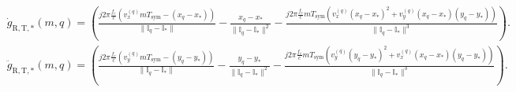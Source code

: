 \documentclass[9pt,final,journal,twocolumn]{IEEEtran}
\begin{document}
\begin{figure}[!t]
\begin{small}
\begin{subequations} \label{derivation_x}
\begin{align} 
  &\dot{g}_{\mathrm{R},\mathrm{T},\ast}(m,q) \!=\!\left(\frac{j2\pi\frac{f_c}{c}(v_{x}^{(q)}mT_{\mathrm{sym}}\!-\!(x_q\!-\!{x}_{\ast}))}{\|{\mathbb I}_{q}-{\mathbb I}_{\ast}\|}-\frac{{x}_q-{x}_{\ast}}{{\|{\mathbb I}_{q}-{\mathbb I}_{\ast}\|^2}} -\frac{j2\pi\frac{f_c}{c}mT_{\mathrm{sym}}(v_{x}^{(q)}({x}_q-{x}_{\ast})^2\!+\!v_{y}^{(q)}({x}_q\!-\!{x}_{\ast})({y}_q\!-\!{y}_{\ast}))}{\|{\mathbb I}_{q}-{\mathbb I}_{\ast}\|^3}\right). & \\
  &\ddot{g}_{\mathrm{R},\mathrm{T},\ast}(m,q) \!=\!\left(\frac{j2\pi\frac{f_c}{c}(v_{y}^{(q)}mT_{\mathrm{sym}}\!-\!(y_q\!-\!{y}_{\ast}))}{\|{\mathbb I}_{q}-{\mathbb I}_{\ast}\|}-\frac{{y}_q-{y}_{\ast}}{{\|{\mathbb I}_{q}-{\mathbb I}_{\ast}\|^2}} -\frac{j2\pi\frac{f_c}{c}mT_{\mathrm{sym}}(v_{y}^{(q)}({y}_q-{y}_{\ast})^2\!+\!v_{x}^{(q)}({x}_q\!-\!{x}_{\ast})({y}_q\!-\!{y}_{\ast}))}{\|{\mathbb I}_{q}-{\mathbb I}_{\ast}\|^3}\right). &  
\end{align}
\end{subequations}
\end{small}
\hrulefill
\end{figure}
\end{document}
